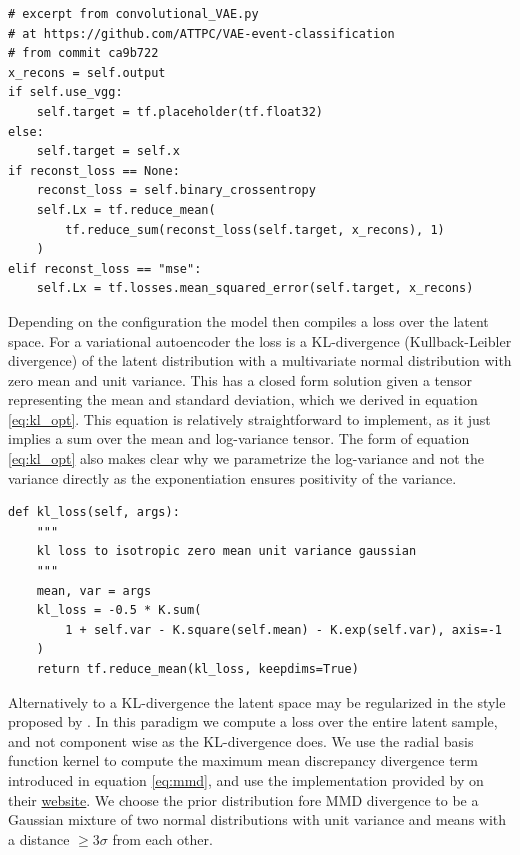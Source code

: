 \begin{minipage}{\linewidth}
\begin{lstlisting}[language=iPython]
# excerpt from convolutional_VAE.py
# at https://github.com/ATTPC/VAE-event-classification
# from commit ca9b722
x_recons = self.output
if self.use_vgg:
    self.target = tf.placeholder(tf.float32)
else:
    self.target = self.x
if reconst_loss == None:
    reconst_loss = self.binary_crossentropy
    self.Lx = tf.reduce_mean(
        tf.reduce_sum(reconst_loss(self.target, x_recons), 1)
    )
elif reconst_loss == "mse":
    self.Lx = tf.losses.mean_squared_error(self.target, x_recons)
\end{lstlisting}
\end{minipage}


Depending on the configuration the model then compiles a loss over the latent space. For a variational autoencoder the loss is a  KL-divergence (Kullback-Leibler divergence) of the latent distribution with a multivariate normal distribution with zero mean and unit variance. This has a closed form solution given a tensor representing the mean and standard deviation, which we derived in equation \ref{eq:kl_opt}. This equation is relatively straightforward to implement, as it just implies a sum over the mean and log-variance tensor. The form of equation \ref{eq:kl_opt} also makes clear why we parametrize the log-variance and not the variance directly as the exponentiation ensures positivity of the variance.


\begin{minipage}{\linewidth}
\begin{lstlisting}[language=iPython]
def kl_loss(self, args):
    """
    kl loss to isotropic zero mean unit variance gaussian
    """
    mean, var = args
    kl_loss = -0.5 * K.sum(
        1 + self.var - K.square(self.mean) - K.exp(self.var), axis=-1
    )
    return tf.reduce_mean(kl_loss, keepdims=True)
\end{lstlisting}
\end{minipage}

Alternatively to a KL-divergence the latent space may be regularized in the style proposed by \citet{Zhao}. In this paradigm we compute a loss over the entire latent sample, and not component wise as the KL-divergence does. We use the radial basis function kernel to compute the maximum mean discrepancy divergence term introduced in equation \ref{eq:mmd}, and use the implementation provided by \cite{Zhao} on their \href{http://szhao.me/2017/06/10/a-tutorial-on-mmd-variational-autoencoders.html}{website}. We choose the prior distribution fore MMD divergence to be a Gaussian mixture of two normal distributions with unit variance and means with a distance $\geq 3\sigma$ from each other. 

